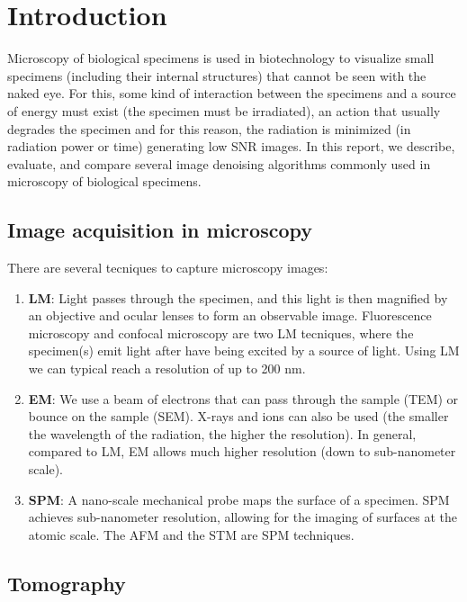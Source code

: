 \chapter{Introduction}

Microscopy of biological specimens is used in biotechnology to
visualize small specimens (including their internal structures) that
cannot be seen with the naked eye. For this, some kind of interaction
between the specimens and a source of energy must exist (the specimen
must be irradiated), an action that usually degrades the specimen and
for this reason, the radiation is minimized (in radiation power or
time) generating low SNR images. In this report, we describe,
evaluate, and compare several image denoising algorithms commonly used
in microscopy of biological specimens.

\section{Image acquisition in microscopy}

There are several tecniques to capture microscopy images:

\begin{enumerate}
  \item \textbf{\gls{LM}}: Light passes through the specimen, and this light
  is then magnified by an objective and ocular lenses to form an
  observable image. Fluorescence microscopy and confocal microscopy
  are two \gls{LM} tecniques, where the specimen(s) emit light after
  have being excited by a source of light. Using \gls{LM} we can
  typical reach a resolution of up to 200 nm.

\item \textbf{\gls{EM}}: We use a beam of electrons that can pass through the
  sample (\gls{TEM}) or bounce on the sample (\gls{SEM}). X-rays and
  ions can also be used (the smaller the wavelength of the radiation,
  the higher the resolution). In general, compared to \gls{LM},
  \gls{EM} allows much higher resolution (down to sub-nanometer
  scale).

\item \textbf{\gls{SPM}}: A nano-scale mechanical probe maps the surface of a
  specimen. \gls{SPM} achieves sub-nanometer resolution, allowing for
  the imaging of surfaces at the atomic scale. The \gls{AFM} and the
  \gls{STM} are \gls{SPM} techniques.
\end{enumerate}
  

\section{Tomography}

